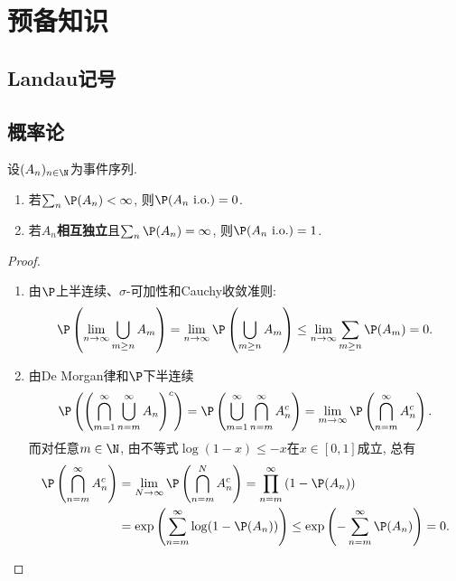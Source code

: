 \section{预备知识}

\subsection{Landau记号}

\subsection{概率论}

\begin{theorem}
	设$(A_n)_{n \in \N}$为事件序列.
	\begin{enumerate}
		\item 若$\sum_n \P(A_n) < \infty$, 则$\P(A_n \text{ i.o.} ) =0$. 
		\item 若$A_n$\textbf{相互独立}且$\sum_n \P(A_n) = \infty$, 则$\P(A_n \text{ i.o.} ) =1$.
	\end{enumerate}
\end{theorem}
\begin{proof}
	\begin{enumerate}
		\item 由$\P$上半连续、$\sigma$-可加性和Cauchy收敛准则: 
		\begin{equation*} 
			\P\left(\lim_{n \to \infty} \bigcup_{m \geq n} A_m\right) 
			= \lim_{n \to \infty} \P \left(\bigcup_{m \geq n} A_m\right) 
			\leq \lim_{n \to \infty} \sum_{m \geq n} \P(A_m) = 0. 
		\end{equation*}
		\item 由De Morgan律和$\P$下半连续
		\begin{equation*}
			\P \left( \left(\bigcap_{m=1}^{\infty} \bigcup_{n=m}^{\infty} A_n \right)^c \right)
			= \P \left( \bigcup_{m=1}^{\infty} \bigcap_{n=m}^{\infty} A_n^c \right) 
			= \lim_{m \to \infty} \P\left( \bigcap_{n=m}^{\infty} A_n^c \right).
		\end{equation*}
		而对任意$m \in \N$, 由不等式$\log(1-x) \leq -x$在$x \in [0,1]$成立, 总有
		\begin{align*}
			\P \left( \bigcap_{n=m}^{\infty} A_n^c \right) 
			&= \lim_{N \to \infty} \P \left( \bigcap_{n=m}^{N} A_n^c \right) 
			= \prod_{n=m}^{\infty} \left( 1 - \P(A_n) \right) \\
			&= \exp\left( \sum_{n=m}^{\infty} \log(1-\P(A_n)) \right)
			\leq \exp\left(- \sum_{n=m}^{\infty} \P(A_n) \right) 
			= 0. 
		\end{align*}
	\end{enumerate}
\end{proof}

